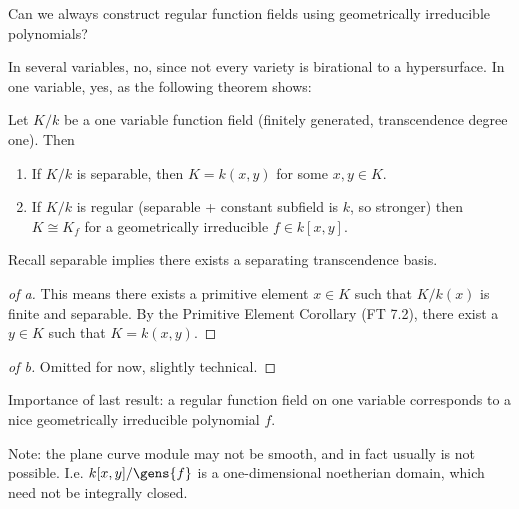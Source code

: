 \begin{question}

Can we always construct regular function fields using geometrically
irreducible polynomials?

\end{question}

\begin{answer}

In several variables, no, since not every variety is birational to a
hypersurface. In one variable, yes, as the following theorem shows:

\end{answer}

\begin{theorem}

Let \(K/k\) be a one variable function field (finitely generated,
transcendence degree one). Then

\begin{enumerate}
\def\labelenumi{\alph{enumi}.}
\item
  If \(K/k\) is separable, then \(K = k(x, y)\) for some \(x, y\in K\).
\item
  If \(K/k\) is regular (separable + constant subfield is \(k\), so
  stronger) then \(K \cong K_f\) for a geometrically irreducible
  \(f\in k[x ,y]\).
\end{enumerate}

\end{theorem}

Recall separable implies there exists a separating transcendence basis.

\begin{proof}[of a]

This means there exists a primitive element \(x\in K\) such that
\(K/k(x)\) is finite and separable. By the Primitive Element Corollary
(FT 7.2), there exist a \(y\in K\) such that \(K = k(x, y)\).

\end{proof}

\begin{proof}[of b]

Omitted for now, slightly technical.

\end{proof}

Importance of last result: a regular function field on one variable
corresponds to a nice geometrically irreducible polynomial \(f\).

\begin{remark}

Note: the plane curve module may not be smooth, and in fact usually is
not possible. I.e. \(k[x ,y]/\gens{f}\) is a one-dimensional noetherian
domain, which need not be integrally closed.

\end{remark}

